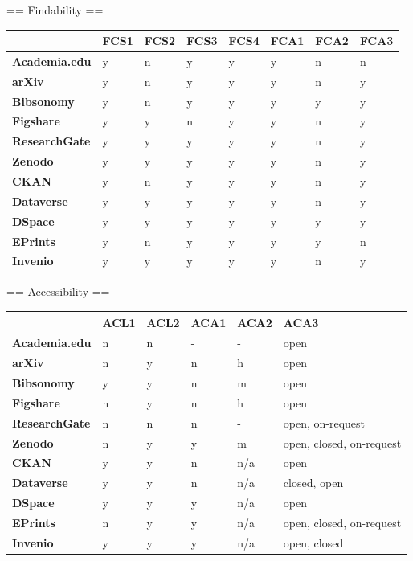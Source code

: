== Findability  ==

\begin{tabular}{|m{2.1cm}|m{0.8cm}|m{0.8cm}|m{0.8cm}|m{0.8cm}|m{0.8cm}|m{0.8cm}|m{0.8cm}|} \hline 
 & \textbf{FCS1}  & \textbf{FCS2}  & \textbf{FCS3}  & \textbf{FCS4}  & \textbf{FCA1}  & \textbf{FCA2}  & \textbf{FCA3}  \\ \hline 
\textbf{Academia.edu}  &y &n &y &y &y &n &n \\ \hline 
\textbf{arXiv}  &y &n &y &y &y &n &y \\ \hline 
\textbf{Bibsonomy}  &y &n &y &y &y &y &y \\ \hline 
\textbf{Figshare}  &y &y &n &y &y &n &y \\ \hline 
\textbf{ResearchGate}  &y &y &y &y &y &n &y \\ \hline 
\textbf{Zenodo}  &y &y &y &y &y &n &y \\ \hline 
 \hline 
\textbf{CKAN}  &y &n &y &y &y &n &y \\ \hline 
\textbf{Dataverse}  &y &y &y &y &y &n &y \\ \hline 
\textbf{DSpace}  &y &y &y &y &y &y &y \\ \hline 
\textbf{EPrints}  &y &n &y &y &y &y &n \\ \hline 
\textbf{Invenio}  &y &y &y &y &y &n &y \\ \hline 
 \end{tabular}


== Accessibility ==

\begin{tabular}{|m{2.1cm}|m{0.8cm}|m{0.8cm}|m{0.8cm}|m{0.8cm}|m{0.8cm}|} \hline 
 & \textbf{ACL1}  & \textbf{ACL2}  & \textbf{ACA1}  & \textbf{ACA2}  & \textbf{ACA3}  \\ \hline 
\textbf{Academia.edu}  &n &n &- &- &open \\ \hline 
\textbf{arXiv}  &n &y &n &h &open \\ \hline 
\textbf{Bibsonomy}  &y &y &n &m &open \\ \hline 
\textbf{Figshare}  &n &y &n &h &open \\ \hline 
\textbf{ResearchGate}  &n &n &n &- &open, on-request \\ \hline 
\textbf{Zenodo}  &n &y &y &m &open, closed, on-request \\ \hline 
 \hline 
\textbf{CKAN}  &y &y &n &n/a &open \\ \hline 
\textbf{Dataverse}  &y &y &n &n/a &closed, open \\ \hline 
\textbf{DSpace}  &y &y &y &n/a &open \\ \hline 
\textbf{EPrints}  &n &y &y &n/a &open, closed, on-request \\ \hline 
\textbf{Invenio}  &y &y &y &n/a &open, closed \\ \hline 
 \end{tabular}


